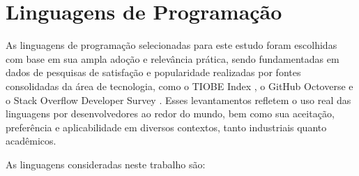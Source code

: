 \documentclass[12pt,oneside,a4paper]{report}
\begin{document}
\section{Linguagens de Programação}

As linguagens de programação selecionadas para este estudo foram escolhidas com base em sua ampla adoção e relevância prática, sendo fundamentadas em dados de pesquisas de satisfação e popularidade realizadas por fontes consolidadas da área de tecnologia, como o TIOBE Index \cite{tiobe}, o GitHub Octoverse \cite{octoverse} e o Stack Overflow Developer Survey \cite{stackoverflow}. Esses levantamentos refletem o uso real das linguagens por desenvolvedores ao redor do mundo, bem como sua aceitação, preferência e aplicabilidade em diversos contextos, tanto industriais quanto acadêmicos.

As linguagens consideradas neste trabalho são:
\end{document}
